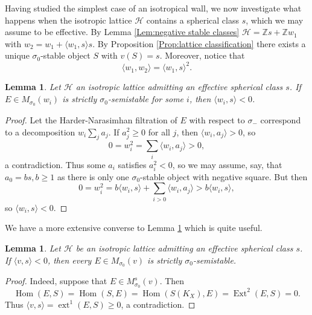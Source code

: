 \documentclass[leqno,11pt]{amsart}
\def\Z{\ensuremath{\mathbb{Z}}}
\def\Ext{\mathop{\mathrm{Ext}}\nolimits}
\def\ext{\mathop{\mathrm{ext}}\nolimits}
\def\Hom{\mathop{\mathrm{Hom}}\nolimits}
\newtheorem{Lem}[Thm]{Lemma}
\theoremstyle{definition}
\def\Z{\ensuremath{\mathbb{Z}}}
\def\HH{\ensuremath{\mathcal H}}
\begin{document}
Having studied the simplest case of an isotropical wall, we now investigate what happens when the isotropic lattice $\HH$ contains a spherical class $s$, which we may assume to be effective.  By Lemma \ref{Lem:negative stable classes} $\HH=\Z s+\Z w_1$ with $w_2=w_1+\langle w_1,s\rangle s$.  By Proposition \ref{Prop:lattice classification} there exists a unique $\sigma_0$-stable object $S$ with $v(S)=s$.  Moreover, notice that 
\begin{equation}\label{eq: spherical isotropic constraint}
\langle w_1,w_2\rangle=\langle w_1,s\rangle^2.
\end{equation}
\begin{Lem}\label{Lem:semistable isotropic}
Let $\HH$ an isotropic lattice admitting an effective spherical class $s$.  If $E\in M_{\sigma_0}(w_{i})$ is strictly $\sigma_0$-semistable for some $i$, then $\langle w_{i},s\rangle<0$.
\end{Lem}
\begin{proof}
Let the Harder-Narasimhan filtration of $E$ with respect to $\sigma_-$ correspond to a decomposition $w_i\sum_j a_j$.  If $a_j^2\geq 0$ for all $j$, then $\langle w_i,a_j\rangle>0$, so $$0=w_i^2=\sum_i \langle w_i,a_j\rangle>0,$$ a contradiction.  Thus some $a_i$ satisfies $a_i^2<0$, so we may assume, say, that $a_0=bs,b\geq 1$ as there is only one $\sigma_0$-stable object with negative square.  But then $$0=w_i^2=b\langle w_i,s\rangle+\sum_{i>0}\langle w_i,a_j\rangle>b\langle w_i,s\rangle,$$ so $\langle w_i,s\rangle<0$. 
\end{proof}

We have a more extensive converse to Lemma \ref{Lem:semistable isotropic} which is quite useful.
\begin{Lem}\label{Lem:semistable positive}
Let $\HH$ be an isotropic lattice admitting an effective spherical class $s$.  If $\langle v,s\rangle<0$, then every $E\in M_{\sigma_0}(v)$ is strictly $\sigma_0$-semistable.
\end{Lem}
\begin{proof}
Indeed, suppose that $E\in M_{\sigma_0}^s(v)$.  Then $$\Hom(E,S)=\Hom(S,E)=\Hom(S(K_X),E)=\Ext^2(E,S)=0.$$  Thus $\langle v,s\rangle=\ext^1(E,S)\geq 0$, a contradiction. 
\end{proof}
\end{document}

